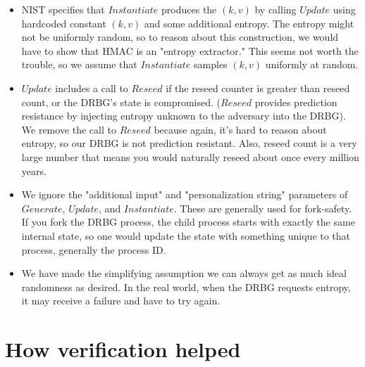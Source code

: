 \documentclass[12pt,lot, lof]{puthesis}
\newcommand{\kv} {$(k, v)$ }
\begin{document}
{\begin{itemize}
\item NIST specifies that $Instantiate$ produces the \kv  by calling $Update$ using hardcoded constant \kv and some additional entropy. The entropy might not be uniformly random, so to reason about this construction, we would have to show that HMAC is an "entropy extractor." This seems not worth the trouble, so we assume that $Instantiate$ samples \kv uniformly at random. %
\item $Update$ includes a call to $Reseed$ if the reseed counter is greater than reseed count, or the DRBG's state is compromised. ($Reseed$ provides prediction resistance by injecting entropy unknown to the adversary into the DRBG). We remove the call to $Reseed$ because again, it's hard to reason about entropy, so our DRBG is not prediction resistant. Also, reseed count is a very large number that means you would naturally reseed about once every million years.
\item We ignore the "additional input" and "personalization string" parameters of $Generate$, $Update$, and $Instantiate$. These are generally used for fork-safety. If you fork the DRBG process, the child process starts with exactly the same internal state, so one would update the state with something unique to that process, generally the process ID.
\item We have made the simplifying assumption we can always get as much ideal randomness as desired. In the real world, when the DRBG requests entropy, it may receive a failure and have to try again.
\end{itemize}




\section{How verification helped} \label{sec:how_verification_helped}

}
\end{document}
